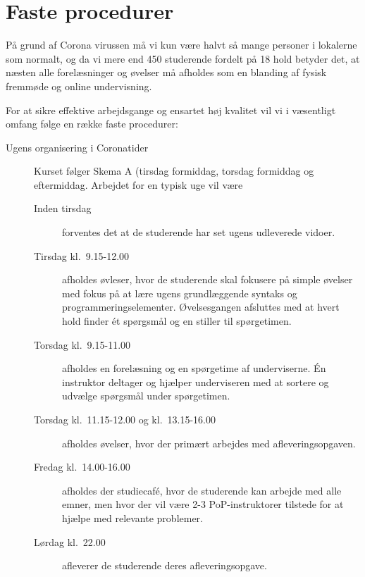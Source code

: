 \documentclass[a4paper]{article}
\begin{document}
\section{Faste procedurer}
På grund af Corona virussen må vi kun være halvt så mange personer i
lokalerne som normalt, og da vi mere end 450 studerende fordelt på 18
hold betyder det, at næsten alle forelæsninger og øvelser må afholdes
som en blanding af fysisk fremmøde og online undervisning.

For at sikre effektive arbejdsgange og ensartet høj kvalitet vil vi i væsentligt omfang følge en række faste procedurer:
\begin{description}
\item[Ugens organisering i Coronatider] Kurset følger Skema A (tirsdag
  formiddag, torsdag formiddag og eftermiddag. Arbejdet for en typisk
  uge vil være
  \begin{description}
  \item[Inden tirsdag] forventes
    det at de studerende har set ugens udleverede vidoer.
  \item[Tirsdag kl.\ 9.15-12.00] afholdes øvleser, hvor de studerende
    skal fokusere på simple øvelser med fokus på at lære ugens
    grundlæggende syntaks og programmeringselementer. Øvelsesgangen
    afsluttes med at hvert hold finder {\'e}t spørgsmål og en stiller
    til spørgetimen.
  \item[Torsdag kl.\ 9.15-11.00] afholdes en forelæsning og en
    spørgetime af underviserne. {\'E}n instruktor deltager og hjælper
    underviseren med at sortere og udvælge spørgsmål under
    spørgetimen.
  \item[Torsdag kl.\ 11.15-12.00 og kl.\ 13.15-16.00] afholdes
    øvelser, hvor der primært arbejdes med afleveringsopgaven.
  \item[Fredag kl.\ 14.00-16.00] afholdes der studiecaf{\'e}, hvor
    de studerende kan arbejde med alle emner, men hvor der vil være
    2-3 PoP-instruktorer tilstede for at hjælpe med relevante
    problemer.
  \item[Lørdag kl.\ 22.00] afleverer de studerende deres afleveringsopgave.
  \end{description}


\end{description}
\end{document}

